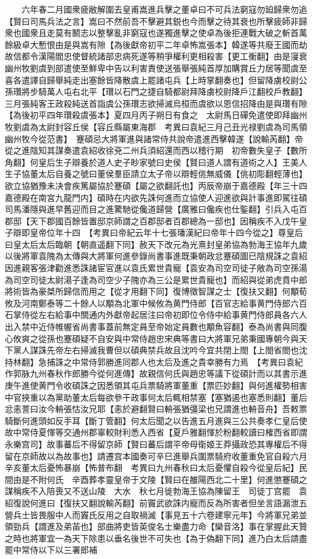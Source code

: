 　　六年春二月國衆疲敝解圍去皇甫嵩進兵擊之董卓曰不可兵法窮寇勿廹歸衆勿追【賢曰司馬兵法之言】嵩曰不然前吾不擊避其鋭也今而擊之待其衰也所擊疲師非歸衆也國衆且走莫有鬭志以整擊亂非窮寇也遂獨進擊之使卓為後拒連戰大破之斬首萬餘級卓大慙恨由是與嵩有隙【為後獻帝初平二年卓怖嵩張本】韓遂等共廢王國而劫故信都令漢陽閻忠使督統諸部忠病死遂等稍爭權利更相殺害【更工衡翻】由是寖衰　幽州牧劉虞到部遣使至鮮卑中告以利害責使送張舉張純首厚加購賞丘力居等聞虞至喜各遣譯自歸舉純走出塞餘皆降散虞上罷諸屯兵【上時掌翻奏也】但留降虜校尉公孫瓚將步騎萬人屯右北平【瓚以石門之捷自騎都尉拜降虜校尉降戶江翻校戶教翻】三月張純客王政殺純送首詣虞公孫瓚志欲掃滅烏桓而虞欲以恩信招降由是與瓚有隙【為後初平四年瓚殺虞張本】夏四月丙子朔日有食之　太尉馬日磾免遣使即拜幽州牧劉虞為太尉封容丘侯【容丘縣屬東海郡　考異曰袁紀三月己丑光禄劉虞為司馬領幽州牧今從范書】　蹇碩忌大將軍進與諸常侍共說帝遣進西擊韓遂【說輸芮翻】帝從之進陰知其謀奏遣袁紹收徐兗二州兵須紹還而西以稽行期　初帝數失皇子【數所角翻】何皇后生子辯養於道人史子眇家號曰史侯【賢曰道人謂有道術之人】王美人生子協董太后自養之號曰董侯羣臣請立太子帝以辯輕佻無威儀【佻初彫翻輕薄也】欲立協猶豫未决會疾篤屬協於蹇碩【屬之欲翻託也】丙辰帝崩于嘉德殿【年三十四嘉德殿在南宮九龍門内】碩時在内欲先誅何進而立協使人迎進欲與計事進即駕往碩司馬潘隱與進早舊迎而目之進驚馳從儳道歸營【廣雅曰儳疾也仕鍳翻】引兵入屯百郡邸【天下郡國百餘皆置邸京師謂之百郡邸者百郡總為一邸也】因稱疾不入戊午皇子辯即皇帝位年十四　【考異曰帝紀云年十七張璠漢紀曰帝年十四今從之】尊皇后曰皇太后太后臨朝【朝直遥翻下同】赦天下改元為光熹封皇弟協為勃海王協年九歲以後將軍袁隗為太傳與大將軍何進參錄尚書事進既秉朝政忿蹇碩圖已陰規誅之袁紹因進親客張津勸進悉誅諸宦官進以袁氏累世貴寵【袁安為司空司徒子敞為司空孫湯為司空司徒太尉湯子逢為司空少子隗亦為三公是累世貴寵也】而紹與從弟虎賁中郎將術皆為豪桀所歸信而用之【從才用翻下同】復博徵智謀之士【復扶又翻】何顒荀攸及河南鄭泰等二十餘人以顒為北軍中候攸為黄門侍郎【百官志給事黄門侍郎六百石掌侍從左右給事中關通内外獻帝起居注曰帝初即位令侍中給事黄門侍郎員各六人出入禁中近侍帷幄省尚書事蓋前無定員至帝始定員數也顒魚容翻】泰為尚書與同腹心攸爽之從孫也蹇碩疑不自安與中常侍趙忠宋典等書曰大將軍兄弟秉國專朝今與天下黨人謀誅先帝左右掃滅我曹但以碩典禁兵故且沈吟今宜共閉上閤【上閤省閤也沈持林翻】急捕誅之中常侍郭勝進同郡人也太后及進之貴幸勝有力焉　【考異曰袁紀作郭脉九州春秋作郎勝今從何進傳】故親信何氏與趙忠等議下從碩計而以其書示進庚午進使黄門令收碩誅之因悉領其屯兵票騎將軍董重【票匹妙翻】與何進權勢相害中官挾重以為黨助董太后每欲參干政事何太后輒相禁塞【塞猶遏也塞悉則翻】董后忿恚詈曰汝今輈張怙汝兄耶【恚於避翻賢曰輈張猶彊梁也兄謂進也輈音舟】吾敕票騎斷何進頭如反手耳【斷丁管翻】何太后聞之以告進五月進與三公共奏孝仁皇后使故中常侍夏惲等交通州郡辜較財利悉入西省【夏戶雅翻惲於粉翻較讀曰榷西省即謂永樂宫司】故事蕃后不得留京師【賢曰蕃后謂平帝母衛姬王莽攝政恐其專權后不得留在京師故以為故事也】請遷宫本國奏可辛巳進舉兵圍票騎府收董重免官自殺六月辛亥董太后憂怖暴崩【怖普布翻　考異曰九州春秋曰太后憂懼自殺今從皇后紀】民間由是不附何氏　辛酉葬孝靈皇帝于文陵【賢曰在雒陽西北二十里】何進懲蹇碩之謀稱疾不入陪喪又不送山陵　大水　秋七月徙勃海王協為陳留王　司徒丁宫罷　袁紹復說何進曰【復扶又翻說輸芮翻】前竇武欲誅内寵而反為所害者但坐言語漏泄五營兵士皆畏服中人而竇氏反用之自取禍滅【事見五十六卷建寧元年】今將軍兄弟並領勁兵【謂進及弟苖也】部曲將吏皆英俊名士樂盡力命【欒音洛】事在掌握此天贊之時也將軍宜一為天下除患以垂名後世不可失也【為于偽翻下同】進乃白太后請盡罷中常侍以下以三署郎補